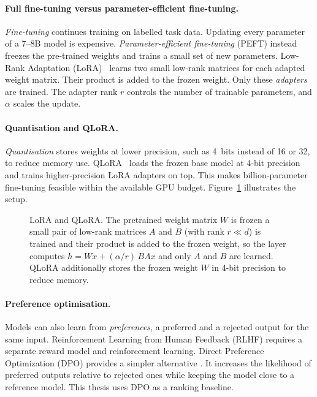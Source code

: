 \paragraph{Full fine-tuning versus parameter-efficient fine-tuning.}
\emph{Fine-tuning} continues training on labelled task data. Updating every parameter of a 7--8B
model is expensive. \emph{Parameter-efficient fine-tuning} (PEFT) instead freezes the pre-trained
weights and trains a small set of new parameters. Low-Rank Adaptation
(LoRA)~\cite{hu2021loralowrankadaptationlarge} learns two small low-rank matrices for each adapted
weight matrix. Their product is added to the frozen weight. Only these \emph{adapters} are trained.
The adapter rank $r$ controls the number of trainable parameters, and $\alpha$ scales the update.

\paragraph{Quantisation and QLoRA.}
\emph{Quantisation} stores weights at lower precision, such as 4~bits instead of 16 or 32, to reduce
memory use. QLoRA~\cite{dettmers2023qloraefficientfinetuningquantized} loads the frozen base model at
4-bit precision and trains higher-precision LoRA adapters on top. This makes billion-parameter
fine-tuning feasible within the available GPU budget. Figure~\ref{fig:lora-qlora} illustrates the
setup.

\begin{figure}[htbp]
  \centering
  
  \caption{LoRA and QLoRA. The pretrained weight matrix $W$ is frozen a small pair of low-rank
  matrices $A$ and $B$ (with rank $r\ll d$) is trained and their product is added to the frozen
  weight, so the layer computes $h = Wx + (\alpha/r)\,BAx$ and only $A$ and $B$ are learned. QLoRA
  additionally stores the frozen weight $W$ in 4-bit precision to reduce memory.}
  \label{fig:lora-qlora}
\end{figure}

\paragraph{Preference optimisation.}
Models can also learn from \emph{preferences}, a preferred and a rejected output for the same input.
Reinforcement Learning from Human Feedback (RLHF) requires a separate reward model and reinforcement
learning. Direct Preference Optimization (DPO) provides a simpler alternative
\cite{rafailov2024directpreferenceoptimizationlanguage}. It increases the likelihood of preferred
outputs relative to rejected ones while keeping the model close to a reference model. This thesis
uses DPO as a ranking baseline.

